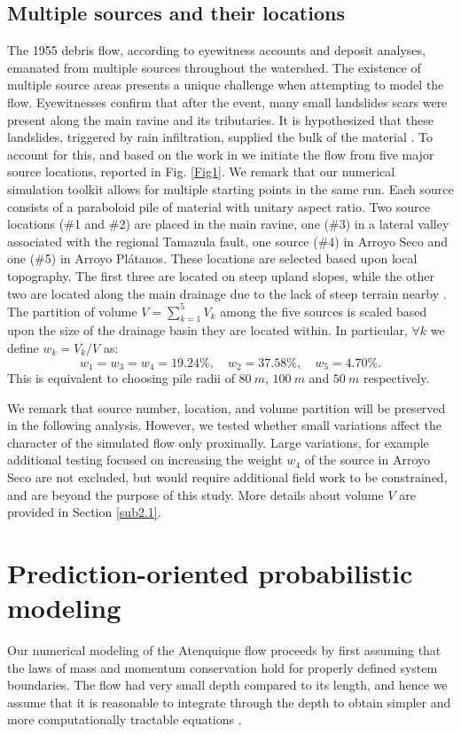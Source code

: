 \documentclass[nhess, manuscript]{copernicus}
\begin{document}
\subsection{Multiple sources and their locations}
The 1955 debris flow, according to eyewitness accounts and deposit analyses, emanated from multiple sources throughout the watershed. The existence of multiple source areas presents a unique challenge when attempting to model the flow. Eyewitnesses confirm that after the event, many small landslides scars were present along the main ravine and its tributaries. It is hypothesized that these landslides, triggered by rain infiltration, supplied the bulk of the material \citep{Saucedo2003, Saucedo2008}. To account for this, and based on the work in \cite{Rupp2004} we initiate the flow from five major source locations, reported in Fig. \ref{Fig1}. We remark that our numerical simulation toolkit allows for multiple starting points in the same run. Each source consists of a paraboloid pile of material with unitary aspect ratio. Two source locations (\#1 and \#2) are placed in the main ravine, one (\#3) in a lateral valley associated with the regional Tamazula fault, one source (\#4) in Arroyo Seco and one (\#5) in Arroyo Pl\'atanos. These locations are selected based upon local topography. The first three are located on steep upland slopes, while the other two are located along the main drainage due to the lack of steep terrain nearby \citep{Rupp2004}. The partition of volume $V=\sum^5_{k=1} V_k$ among the five sources is scaled based upon the size of the drainage basin they are located within. In particular, $\forall k$ we define $w_k=V_k/V$ as:
$$w_1=w_3=w_4=19.24\%, \quad w_2=37.58\%, \quad w_5=4.70\%.$$
This is equivalent to choosing pile radii of $80\ m$, $100\ m$ and $50\ m$ respectively.

We remark that source number, location, and volume partition will be preserved in the following analysis. However, we tested whether small variations affect the character of the simulated flow only proximally. Large variations, for example additional testing focused on increasing the weight $w_4$ of the source in Arroyo Seco are not excluded, but would require additional field work to be constrained, and are beyond the purpose of this study. More details about volume $V$ are provided in Section \ref{sub2.1}.

\section{Prediction-oriented probabilistic modeling}\label{s2}
Our numerical modeling of the Atenquique flow proceeds by first assuming that the laws of mass and momentum conservation hold for properly defined system boundaries. The flow had very small depth compared to its length, and hence we assume that it is reasonable to integrate through the depth to obtain simpler and more computationally tractable equations \citep{SavageHutter1989}.
\end{document}
